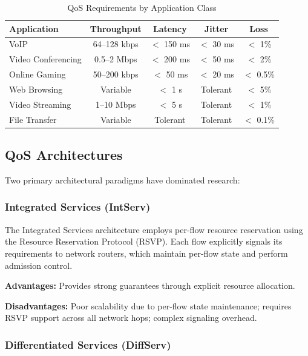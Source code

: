 \begin{table}[htbp]
\centering
\caption{QoS Requirements by Application Class}
\label{tab:qos-requirements}
\begin{tabular}{@{}lcccc@{}}
\toprule
\textbf{Application} & \textbf{Throughput} & \textbf{Latency} & \textbf{Jitter} & \textbf{Loss} \\
\midrule
VoIP & 64–128 kbps & $<$ 150 ms & $<$ 30 ms & $<$ 1\% \\
Video Conferencing & 0.5–2 Mbps & $<$ 200 ms & $<$ 50 ms & $<$ 2\% \\
Online Gaming & 50–200 kbps & $<$ 50 ms & $<$ 20 ms & $<$ 0.5\% \\
Web Browsing & Variable & $<$ 1 s & Tolerant & $<$ 5\% \\
Video Streaming & 1–10 Mbps & $<$ 5 s & Tolerant & $<$ 1\% \\
File Transfer & Variable & Tolerant & Tolerant & $<$ 0.1\% \\
\bottomrule
\end{tabular}
\end{table}

\subsection{QoS Architectures}

Two primary architectural paradigms have dominated \qos research:

\subsubsection{Integrated Services (IntServ)}

The Integrated Services architecture \cite{rfc2205} employs per-flow resource reservation using the Resource Reservation Protocol (RSVP). Each flow explicitly signals its \qos requirements to network routers, which maintain per-flow state and perform admission control.

\textbf{Advantages:} Provides strong \qos guarantees through explicit resource allocation.

\textbf{Disadvantages:} Poor scalability due to per-flow state maintenance; requires RSVP support across all network hops; complex signaling overhead.

\subsubsection{Differentiated Services (DiffServ)}

